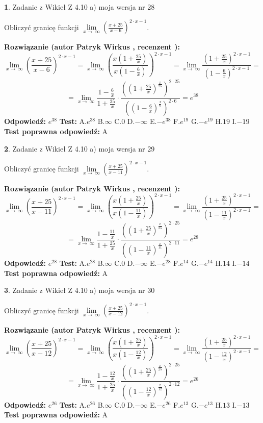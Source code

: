 \documentclass[12pt, a4paper]{article}
\theoremstyle{definition} %
\newtheorem{zad}{}
\newcommand{\zadStart}[1]{\begin{zad}#1\newline}
\newcommand{\zadStop}{\end{zad}}
\newcommand{\rozwStart}[2]{\noindent \textbf{Rozwiązanie (autor #1 , recenzent #2): }\newline}
\newcommand{\rozwStop}{\newline}
\newcommand{\odpStart}{\noindent \textbf{Odpowiedź:}\newline}
\newcommand{\odpStop}{\newline}
\newcommand{\testStart}{\noindent \textbf{Test:}\newline}
\newcommand{\testStop}{\newline}
\newcommand{\kluczStart}{\noindent \textbf{Test poprawna odpowiedź:}\newline}
\newcommand{\kluczStop}{\newline}
\begin{document}
\zadStart{Zadanie z Wikieł Z 4.10 a) moja wersja nr 28}

Obliczyć granicę funkcji  $\lim\limits_{x\to\ \infty}(\frac{x+25}{x-6})^{2\cdot x-1}$.
\zadStop
\rozwStart{Patryk Wirkus}{}
$$\lim\limits_{x\to\ \infty}(\frac{x+25}{x-6})^{2\cdot x-1} = \lim\limits_{x\to\ \infty}(\frac{x(1+\frac{25}{x})}{x(1-\frac{6}{x})})^{2\cdot x-1}=\lim\limits_{x\to\ \infty}\frac{(1+\frac{25}{x})^{2\cdot x-1}}{(1-\frac{6}{x})^{2\cdot x-1}}=$$
$$=\lim\limits_{x\to\ \infty}\frac{1-\frac{6}{x}}{1+\frac{25}{x}}\cdot\frac{((1+\frac{25}{x})^{\frac{x}{25}})^{2\cdot25}}{((1-\frac{6}{x})^{\frac{x}{6}})^{2\cdot6}}=e^{38}$$
\rozwStop
\odpStart
$e^{38}$
\odpStop
\testStart
A.$e^{38}$ B.$\infty$ C.$0$ D.$-\infty$ E.$-e^{38}$
F.$e^{19}$ G.$-e^{19}$
H.$19$
I.$-19$
\testStop
\kluczStart
A
\kluczStop



\zadStart{Zadanie z Wikieł Z 4.10 a) moja wersja nr 29}

Obliczyć granicę funkcji  $\lim\limits_{x\to\ \infty}(\frac{x+25}{x-11})^{2\cdot x-1}$.
\zadStop
\rozwStart{Patryk Wirkus}{}
$$\lim\limits_{x\to\ \infty}(\frac{x+25}{x-11})^{2\cdot x-1} = \lim\limits_{x\to\ \infty}(\frac{x(1+\frac{25}{x})}{x(1-\frac{11}{x})})^{2\cdot x-1}=\lim\limits_{x\to\ \infty}\frac{(1+\frac{25}{x})^{2\cdot x-1}}{(1-\frac{11}{x})^{2\cdot x-1}}=$$
$$=\lim\limits_{x\to\ \infty}\frac{1-\frac{11}{x}}{1+\frac{25}{x}}\cdot\frac{((1+\frac{25}{x})^{\frac{x}{25}})^{2\cdot25}}{((1-\frac{11}{x})^{\frac{x}{11}})^{2\cdot11}}=e^{28}$$
\rozwStop
\odpStart
$e^{28}$
\odpStop
\testStart
A.$e^{28}$ B.$\infty$ C.$0$ D.$-\infty$ E.$-e^{28}$
F.$e^{14}$ G.$-e^{14}$
H.$14$
I.$-14$
\testStop
\kluczStart
A
\kluczStop



\zadStart{Zadanie z Wikieł Z 4.10 a) moja wersja nr 30}

Obliczyć granicę funkcji  $\lim\limits_{x\to\ \infty}(\frac{x+25}{x-12})^{2\cdot x-1}$.
\zadStop
\rozwStart{Patryk Wirkus}{}
$$\lim\limits_{x\to\ \infty}(\frac{x+25}{x-12})^{2\cdot x-1} = \lim\limits_{x\to\ \infty}(\frac{x(1+\frac{25}{x})}{x(1-\frac{12}{x})})^{2\cdot x-1}=\lim\limits_{x\to\ \infty}\frac{(1+\frac{25}{x})^{2\cdot x-1}}{(1-\frac{12}{x})^{2\cdot x-1}}=$$
$$=\lim\limits_{x\to\ \infty}\frac{1-\frac{12}{x}}{1+\frac{25}{x}}\cdot\frac{((1+\frac{25}{x})^{\frac{x}{25}})^{2\cdot25}}{((1-\frac{12}{x})^{\frac{x}{12}})^{2\cdot12}}=e^{26}$$
\rozwStop
\odpStart
$e^{26}$
\odpStop
\testStart
A.$e^{26}$ B.$\infty$ C.$0$ D.$-\infty$ E.$-e^{26}$
F.$e^{13}$ G.$-e^{13}$
H.$13$
I.$-13$
\testStop
\kluczStart
A
\kluczStop
\end{document}
